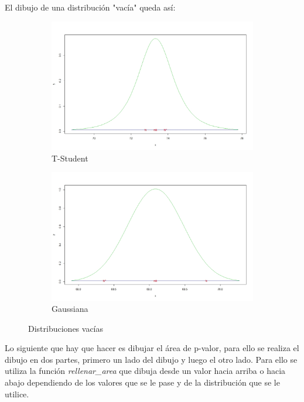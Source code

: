 \inputminted[firstline=27, lastline=46]{R}{../R/dependencias.R}

El dibujo de una distribución "vacía" queda así:

\begin{figure}[h]
	\begin{subfigure}{0.5\textwidth}
		\includegraphics[width=\linewidth]{assets/distribucion-limpia-student.jpeg}
		\caption{T-Student}
		\label{fig:subim1}
	\end{subfigure}
	\begin{subfigure}{0.5\textwidth}
		\includegraphics[width=\linewidth]{assets/distribucion-limpia-normal.jpeg}
		\caption{Gaussiana}
		\label{fig:subim2}
	\end{subfigure}
	\caption{Distribuciones vacías}
	\label{fig:image1}
\end{figure}

Lo siguiente que hay que hacer es dibujar el área de p-valor, para ello se realiza el dibujo en dos partes, primero un lado del dibujo y luego el otro lado. Para ello se utiliza la función \textit{rellenar\_area} que dibuja desde un valor hacia arriba o hacia abajo dependiendo de los valores que se le pase y de la distribución que se le utilice.

